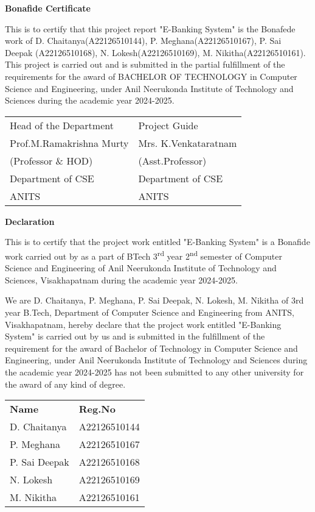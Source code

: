\documentclass[12pt,a4paper]{report}
\begin{document}
\thispagestyle{empty}
\begin{center}
    \Large\textbf{Bonafide Certificate}
\end{center}
\vspace{1cm}

This is to certify that this project report "E-Banking System" is the Bonafede
work of D. Chaitanya(A22126510144), P. Meghana(A22126510167), P. Sai Deepak
(A22126510168), N. Lokesh(A22126510169), M. Nikitha(A22126510161). This project
is carried out and is submitted in the partial fulfillment of the requirements
for the award of BACHELOR OF TECHNOLOGY in Computer Science and Engineering,
under Anil Neerukonda Institute of Technology and Sciences during the academic
year 2024-2025.

\vspace{2cm}
\begin{tabular}{ll}
Head of the Department & Project Guide \\
Prof.M.Ramakrishna Murty & Mrs. K.Venkataratnam \\
(Professor \& HOD) & (Asst.Professor) \\
Department of CSE & Department of CSE \\
ANITS & ANITS
\end{tabular}
\newpage

\thispagestyle{empty}
\begin{center}
    \Large\textbf{Declaration}
\end{center}
\vspace{1cm}

This is to certify that the project work entitled "E-Banking System" is a
Bonafide work carried out by as a part of BTech 3\textsuperscript{rd} year
2\textsuperscript{nd} semester of Computer Science and Engineering of Anil
Neerukonda Institute of Technology and Sciences, Visakhapatnam during the
academic year 2024-2025.

We are D. Chaitanya, P. Meghana, P. Sai Deepak, N. Lokesh, M. Nikitha of 3rd
year B.Tech, Department of Computer Science and Engineering from ANITS,
Visakhapatnam, hereby declare that the project work entitled "E-Banking System"
is carried out by us and is submitted in the fulfillment of the requirement for
the award of Bachelor of Technology in Computer Science and Engineering, under
Anil Neerukonda Institute of Technology and Sciences during the academic year
2024-2025 has not been submitted to any other university for the award of any
kind of degree.

\vspace{2cm}
\begin{tabular}{ll}
\textbf{Name} & \textbf{Reg.No} \\
D. Chaitanya & A22126510144 \\
P. Meghana & A22126510167 \\
P. Sai Deepak & A22126510168 \\
N. Lokesh & A22126510169 \\
M. Nikitha & A22126510161 \\
\end{tabular}
\newpage
\end{document}
